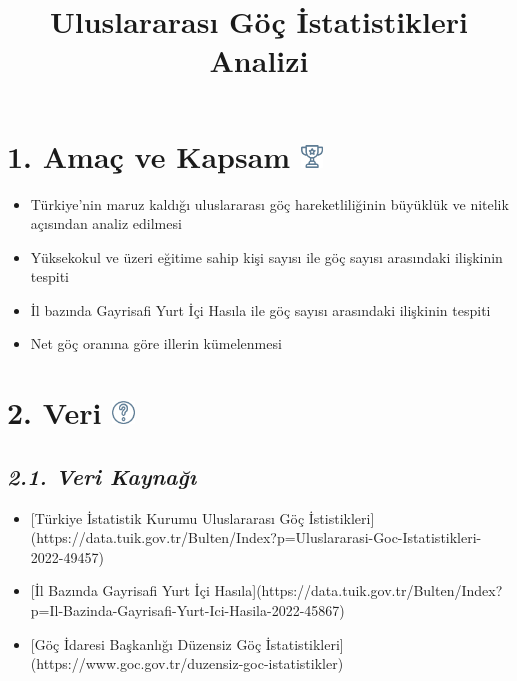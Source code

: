 \documentclass[
  11pt,
  a4paper,
  DIV=11,
  numbers=noendperiod]{scrartcl}
\title{Uluslararası Göç İstatistikleri Analizi}
\author{}
\date{}
\begin{document}
\maketitle

\section[{1. Amaç ve Kapsam} ]{\texorpdfstring{{1. Amaç ve Kapsam}
\protect\includegraphics[width=0.23958in,height=0.23958in]{images/clipboard-3134960358.png}}{1. Amaç ve Kapsam }}\label{amauxe7-ve-kapsam}

\begin{itemize}
\item
  Türkiye'nin maruz kaldığı uluslararası göç hareketliliğinin büyüklük
  ve nitelik açısından analiz edilmesi
\item
  Yüksekokul ve üzeri eğitime sahip kişi sayısı ile göç sayısı
  arasındaki ilişkinin tespiti
\item
  İl bazında Gayrisafi Yurt İçi Hasıla ile göç sayısı arasındaki
  ilişkinin tespiti
\item
  Net göç oranına göre illerin kümelenmesi
\end{itemize}

\section[{2. Veri} ]{\texorpdfstring{{2. Veri}
\protect\includegraphics[width=0.23958in,height=0.23958in]{images/clipboard-442643652.png}}{2. Veri }}\label{veri}

\subsection{\texorpdfstring{{\emph{2.1. Veri
Kaynağı}}}{2.1. Veri Kaynağı}}\label{veri-kaynaux11fux131}

\begin{itemize}
\item
  {[}Türkiye İstatistik Kurumu Uluslararası Göç
  İstistikleri{]}(https://data.tuik.gov.tr/Bulten/Index?p=Uluslararasi-Goc-Istatistikleri-2022-49457)
\item
  {[}İl Bazında Gayrisafi Yurt İçi
  Hasıla{]}(https://data.tuik.gov.tr/Bulten/Index?p=Il-Bazinda-Gayrisafi-Yurt-Ici-Hasila-2022-45867)
\item
  {[}Göç İdaresi Başkanlığı Düzensiz Göç
  İstatistikleri{]}(https://www.goc.gov.tr/duzensiz-goc-istatistikler)
\end{itemize}
\end{document}
